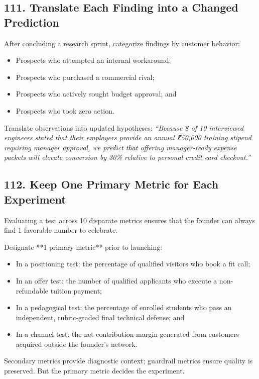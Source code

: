 \subsection*{111. Translate Each Finding into a Changed Prediction}

After concluding a research sprint, categorize findings by customer behavior:
\begin{itemize}
    \item Prospects who attempted an internal workaround;
    \item Prospects who purchased a commercial rival;
    \item Prospects who actively sought budget approval; and
    \item Prospects who took zero action.
\end{itemize}

Translate observations into updated hypotheses: \emph{``Because 8 of 10 interviewed engineers stated that their employers provide an annual ₹50,000 training stipend requiring manager approval, we predict that offering manager-ready expense packets will elevate conversion by 30\% relative to personal credit card checkout.''}

\subsection*{112. Keep One Primary Metric for Each Experiment}

Evaluating a test across 10 disparate metrics ensures that the founder can always find 1 favorable number to celebrate.

Designate **1 primary metric** prior to launching:
\begin{itemize}
    \item In a positioning test: the percentage of qualified visitors who book a fit call;
    \item In an offer test: the number of qualified applicants who execute a non-refundable tuition payment;
    \item In a pedagogical test: the percentage of enrolled students who pass an independent, rubric-graded final technical defense; and
    \item In a channel test: the net contribution margin generated from customers acquired outside the founder's network.
\end{itemize}

Secondary metrics provide diagnostic context; guardrail metrics ensure quality is preserved. But the primary metric decides the experiment.

